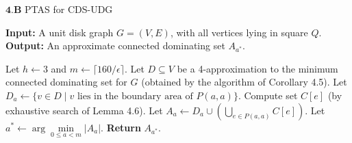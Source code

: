 


\renewcommand{\thealgorithm}{4.B}

\begin{algorithm}[H]

\caption{$\textbf{4.B}$ PTAS for CDS-UDG}
\textbf{Input:} A unit disk graph $G = (V, E)$, with all vertices lying in square $Q$.\\
\textbf{Output:} An approximate connected dominating set $A_{a^*}$.
\small
\begin{algorithmic}[1]
    \State Let $h \gets 3$ and $m \gets \lceil 160/\epsilon \rceil$.
    \State Let $D \subseteq V$ be a 4-approximation to the minimum connected dominating set for $G$ (obtained by the algorithm of Corollary 4.5).
        \State Let $D_a \gets \{v \in D \mid v \text{ lies in the boundary area of } P(a, a)\}$.
            \State Compute set $C[e]$ (by exhaustive search of Lemma 4.6).
        \EndFor
        \State Let $A_a \gets D_a \cup \left( \bigcup\limits_{e \in P(a,a)} C[e] \right)$.
    \EndFor
    \State Let $a^* \gets \arg\min\limits_{0 \leq a < m} |A_a|$.
    \State \textbf{Return} $A_{a^*}$.
\end{algorithmic}
\end{algorithm}